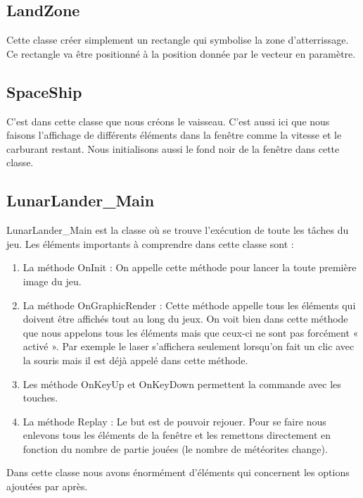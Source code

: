 \subsection{LandZone}
Cette classe créer simplement un rectangle qui symbolise la zone d’atterrissage. Ce rectangle va être positionné à la position donnée par le vecteur en paramètre.

\subsection{SpaceShip}
C’est dans cette classe que nous créons le vaisseau. C’est aussi ici que nous faisons l’affichage de différents éléments dans la fenêtre comme la vitesse et le carburant restant. Nous initialisons aussi le fond noir de la fenêtre dans cette classe.

\subsection{LunarLander\_Main}
LunarLander_Main est la classe où se trouve l’exécution de toute les tâches du jeu. Les éléments importants à comprendre dans cette classe sont :

\begin{enumerate}
\item	La méthode OnInit : On appelle cette méthode pour lancer la toute première image du jeu.
\item	La méthode OnGraphicRender : Cette méthode appelle tous les éléments qui doivent être affichés tout au long du jeux. On voit bien dans cette méthode que nous appelons tous les éléments mais que ceux-ci ne sont pas forcément « activé ». Par exemple le laser s’affichera seulement lorsqu’on fait un clic avec la souris mais il est déjà appelé dans cette méthode.
\item	Les méthode OnKeyUp et OnKeyDown permettent la commande avec les touches.
\item La méthode Replay : Le but est de pouvoir rejouer. Pour se faire nous enlevons tous les éléments de la fenêtre et les remettons directement en fonction du nombre de partie jouées (le nombre de météorites change).
\end{enumerate}

Dans cette classe nous avons énormément d’éléments qui concernent les options ajoutées par après.
